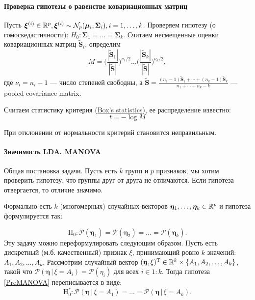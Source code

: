 \paragraph{Проверка гипотезы о равенстве ковариационных матриц}
Пусть $\bm\xi^{(i)} \in \mathbb{R}^{p}, \bm\xi^{(i)} \sim \mathcal{N}_p (\bm\mu_i, \bm\Sigma_i), i = 1, \dots, k$. Проверяем гипотезу (о гомоскедастичности):
$H_0: \bm\Sigma_1 = \dots = \bm\Sigma_k$.
 Считаем несмещенные оценки ковариационных матриц $\tilde{\mathbf{S}}_i$, определим
%
\begin{equation*}
M = \Big (\frac{|\tilde{\mathbf{S}}_1|}{|\tilde{\mathbf{S}}|} \Big )^{\nu_1/2} \dots  \Big (\frac{|\tilde{\mathbf{S}}_k|}{|\tilde{\mathbf{S}}|} \Big )^{\nu_k/2},
\end{equation*}
%
где $\nu_i = n_i - 1$ --- число степеней свободны, а $\tilde{\mathbf{S}} = \frac{(n_1 - 1)\tilde{\mathbf{S}}_1 + \cdots + (n_k - 1)\tilde{\mathbf{S}}_k}{n_1 + \cdots + n_k - k}$ --- pooled covariance matrix.

Считаем статистику критерия (\underline{Box's statistics}), ее распределение известно:
%
\begin{equation*}
t = - \log M
\end{equation*}
%

При отклонении от нормальности критерий становится неправильным.

\paragraph{Значимость LDA. MANOVA}
Общая постановка задачи.
Пусть есть $k$ групп и $p$ признаков, мы хотим проверить гипотезу, что группы друг от друга не отличаются. Если гипотеза отвергается, то отличие значимо.

Формально есть $k$ (многомерных) случайных векторов $\bm \eta_1, \ldots, \bm \eta_k \in \mathbb{R}^p$ и гипотеза формулируется так:

\begin{equation}
    \label{PreMANOVA}
    \mathrm H_0: \mathcal P(\bm \eta_1) = \mathcal P(\bm \eta_2) = \ldots = \mathcal P(\bm \eta_k).
\end{equation}
Эту задачу можно переформулировать следующим образом.
Пусть есть дискретный (м.б. качественный) признак $\xi$, принимающий ровно $k$ значений: $A_1, A_2, \ldots, A_k$.
Рассмотрим случайный вектор $(\bm \eta, \xi)^{\mathrm{T}} \in \mathbb{R}^k \times \{A_1, A_2, \ldots, A_k\}$,
такой что $\mathcal P(\bm \eta \, | \, \xi = A_i) = \mathcal P(\eta_i)$ для всех $i \in 1:k$.
Тогда гипотеза \eqref{PreMANOVA} переписывается в виде:
\begin{equation}
    \label{PreMANOVA2}
    \mathrm H_0^*: \mathcal P(\bm \eta \, | \, \xi = A_1) = \ldots = \mathcal P(\bm \eta \, | \, \xi = A_k).
\end{equation}

